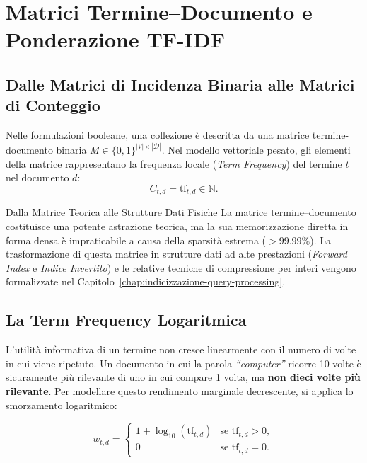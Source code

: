 \FloatBarrier
\section{Matrici Termine--Documento e Ponderazione TF-IDF}
\label{sec:tfidf-weighting}

\subsection{Dalle Matrici di Incidenza Binaria alle Matrici di Conteggio}
Nelle formulazioni booleane, una collezione \`e descritta da una matrice termine-documento binaria $M \in \{0, 1\}^{|V| \times |\mathcal{D}|}$. Nel modello vettoriale pesato, gli elementi della matrice rappresentano la frequenza locale (\textit{Term Frequency}) del termine $t$ nel documento $d$:
\begin{equation}
C_{t,d} = \text{tf}_{t,d} \in \mathbb{N}.
\end{equation}

\begin{noteblock}{Dalla Matrice Teorica alle Strutture Dati Fisiche}
La matrice termine--documento costituisce una potente astrazione teorica, ma la sua memorizzazione diretta in forma densa \`e impraticabile a causa della sparsit\`a estrema ($> 99.99\%$). La trasformazione di questa matrice in strutture dati ad alte prestazioni (\textit{Forward Index} e \textit{Indice Invertito}) e le relative tecniche di compressione per interi vengono formalizzate nel Capitolo~\ref{chap:indicizzazione-query-processing}.
\end{noteblock}

\subsection{La Term Frequency Logaritmica}
L'utilit\`a informativa di un termine non cresce linearmente con il numero di volte in cui viene ripetuto. Un documento in cui la parola \textit{``computer''} ricorre 10 volte \`e sicuramente pi\`u rilevante di uno in cui compare 1 volta, ma \textbf{non dieci volte pi\`u rilevante}. Per modellare questo rendimento marginale decrescente, si applica lo smorzamento logaritmico:

\begin{equation}
w_{t,d} = \begin{cases} 1 + \log_{10}(\text{tf}_{t,d}) & \text{se } \text{tf}_{t,d} > 0, \\ 0 & \text{se } \text{tf}_{t,d} = 0. \end{cases}
\label{eq:log-tf}
\end{equation}

